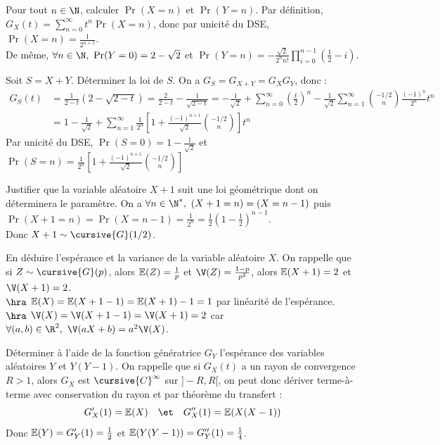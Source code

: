 \documentclass[french, 11pt]{article}
\begin{document}
\begin{question}{}{}
    Pour tout $n\in\N$, calculer $\Pr(X=n)$ et $\Pr(Y=n)$.
    \tcblower
    Par définition, $G_X(t) = \sum_{n=0}^\infty t^n \Pr(X=n)$, donc par unicité du DSE, $\Pr(X=n)=\frac{1}{2^{n+1}}$.\\
    De même, $\forall n \in \N, ~ \Pr(Y=0)=2-\sqrt{2}$ et $\Pr(Y=n)=-\frac{\sqrt{2}}{2^nn!}\prod_{i=0}^{n-1}\left( \frac{1}{2}-i \right)$.
\end{question}

\begin{question}{}{}
    Soit $S=X+Y$. Déterminer la loi de $S$.
    \tcblower
    On a $G_S = G_{X+Y} = G_XG_Y$, donc : 
    \begin{align*}
        G_S(t) &= \frac{1}{2-t}(2-\sqrt{2-t}) = \frac{2}{2-t} - \frac{1}{\sqrt{2-t}} = - \frac{1}{\sqrt{2}} + \sum_{n=0}^{\infty}\left( \frac{t}{2} \right)^n - \frac{1}{\sqrt{2}} \sum_{n=1}^{\infty}\binom{-1/2}{n}\frac{(-1)^n}{2^n}t^n\\
        &=1 - \frac{1}{\sqrt{2}} + \sum_{n=1}^{\infty}\frac{1}{2^n}\left[ 1 + \frac{(-1)^{n+1}}{\sqrt{2}} \binom{-1/2}{n} \right]t^n
    \end{align*}
    Par unicité du DSE, $\Pr(S=0) = 1 - \frac{1}{\sqrt{2}}$ et $\Pr(S=n)=\frac{1}{2^n}\left[ 1 + \frac{(-1)^{n+1}}{\sqrt{2}} \binom{-1/2}{n}\right]$
\end{question}

\begin{question}{}{}
    Justifier que la variable aléatoire $X+1$ suit une loi géométrique dont on déterminera le paramètre.
    \tcblower
    On a $\forall n \in \N^*, ~ (X+1=n) = (X=n-1)$ puis $\Pr(X+1=n)=\Pr(X=n-1)=\frac{1}{2^n}=\frac{1}{2}(1-\frac{1}{2})^{n-1}$.\\
    Donc $X+1\sim \cursive{G}(1/2)$.
\end{question}

\begin{question}{}{}
    En déduire l'espérance et la variance de la variable aléatoire $X$.
    \tcblower
    On rappelle que si $Z\sim\cursive{G}(p)$, alors $\mathbb{E}(Z)=\frac{1}{p}$ et $\V(Z)=\frac{1-p}{p^2}$, alors $\mathbb{E}(X+1)=2$ et $\V(X+1)=2$.\\
    $\hra$ $\mathbb{E}(X) = \mathbb{E}(X+1-1) = \mathbb{E}(X+1) - 1 = 1$ par linéarité de l'espérance.\\
    $\hra$ $\V(X) = \V(X+1-1) = \V(X+1) = 2$ car $\forall (a,b) \in \R^2, ~ \V(aX+b) = a^2\V(X)$.
\end{question}

\begin{question}{}{}
    Déterminer à l'aide de la fonction génératrice $G_Y$ l'espérance des variables aléatoires $Y$ et $Y(Y-1)$.
    \tcblower
    On rappelle que si $G_X(t)$ a un rayon de convergence $R>1$, alors $G_X$ est $\cursive{C}^\infty$ sur $]-R,R[$, on peut donc dériver terme-à-terme avec conservation du rayon et par théorème du transfert :
    \begin{equation*}
        G'_X(1) = \E(X) \quad \et \quad G''_X(1) = \E(X(X-1))
    \end{equation*} 
    Donc $\mathbb{E}(Y)=G'_Y(1) = \frac{1}{2}$ et $\mathbb{E}(Y(Y-1))=G''_Y(1)=\frac{1}{4}$.
\end{question}
\end{document}
